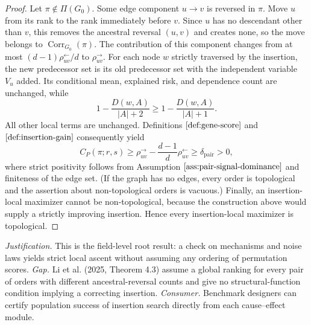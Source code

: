 \documentclass{article}
\begin{document}
\begin{proof}
Let \(\pi\notin\Pi(G_0)\).  Some edge component \(u\to v\) is reversed in \(\pi\).  Move \(u\) from its rank to the rank immediately before \(v\).  Since \(u\) has no descendant other than \(v\), this removes the ancestral reversal \((u,v)\) and creates none, so the move belongs to \(\operatorname{Corr}_{G_0}(\pi)\).  The contribution of this component changes from at most \((d-1)\rho^{\leftarrow}_{uv}/d\) to \(\rho^{\to}_{uv}\).  For each node \(w\) strictly traversed by the insertion, the new predecessor set is its old predecessor set with the independent variable \(V_u\) added.  Its conditional mean, explained risk, and dependence count are unchanged, while
\[
 1-\frac{D(w,A)}{|A|+2}\ge 1-\frac{D(w,A)}{|A|+1}.
\]
All other local terms are unchanged.  Definitions \(\ref{def:gene-score}\) and \(\ref{def:insertion-gain}\) consequently yield
\[
 C_P(\pi;r,s)
 \ge \rho^{\to}_{uv}-\frac{d-1}{d}\rho^{\leftarrow}_{uv}
 \ge\delta_{\mathrm{pair}}>0,
\]
where strict positivity follows from Assumption \(\ref{ass:pair-signal-dominance}\) and finiteness of the edge set.  (If the graph has no edges, every order is topological and the assertion about non-topological orders is vacuous.)  Finally, an insertion-local maximizer cannot be non-topological, because the construction above would supply a strictly improving insertion.  Hence every insertion-local maximizer is topological.
\end{proof}
\par\smallskip\noindent \textit{Justification.} This is the field-level root result: a check on mechanisms and noise laws yields strict local ascent without assuming any ordering of permutation scores. \textit{Gap.} Li et al. (2025, Theorem 4.3) assume a global ranking for every pair of orders with different ancestral-reversal counts and give no structural-function condition implying a correcting insertion. \textit{Consumer.} Benchmark designers can certify population success of insertion search directly from each cause--effect module.
\end{document}
